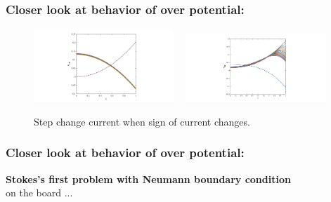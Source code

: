 \documentclass[10pt,xcolor=dvipsnames,compress]{beamer}
\begin{document}
\begin{frame}
\frametitle{Closer look at behavior of over potential:}
\vfill


\begin{figure}[h]
    \centering
    \includegraphics[trim = 9.6in 0.2in 9.6in 0.2in, clip, width=0.47\textwidth]{figs/eta_LF.png} 
    ~
    \includegraphics[trim = 7in 0.2in 7in 0.2in, clip, width=0.47\textwidth]{figs/eta_HF.png}
        \vspace{-3mm}
\caption{Step change current when sign of current changes.} 
\end{figure}


\vfill
\end{frame}


\begin{frame}
\frametitle{Closer look at behavior of over potential:}
\vfill

\begin{center}
\textbf{\large Stokes's first problem with Neumann boundary condition}\\
on the board ...
\end{center}

\vfill
\end{frame}
\end{document}
